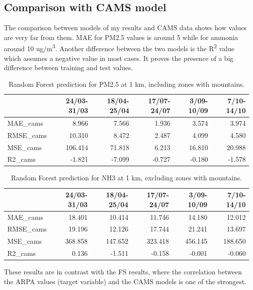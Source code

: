 \subsection{Comparison with CAMS model}
The comparison between models of my results and CAMS data shows how values are very far from them. MAE for PM2.5 values is around 5 while for ammonia around 10 ug/m\textsuperscript{3}. 
Another difference between the two models is the R\textsuperscript{2} value which assumes a negative value in most cases. It proves the presence of a big difference between training and test values. 


\begin{table}[H]
\begin{tabular}{lrrrrr}
\toprule
  &  24/03-31/03 &  18/04-25/04 &  17/07-24/07 &  3/09-10/09 &  7/10-14/10 \\
\midrule
   MAE\_cams &        8.966 &        7.566 &        1.936 &       3.574 &       3.974 \\
  RMSE\_cams &       10.310 &        8.472 &        2.487 &       4.099 &       4.580 \\
   MSE\_cams &      106.414 &       71.818 &        6.213 &      16.810 &      20.988 \\
    R2\_cams &       -1.821 &       -7.099 &       -0.727 &      -0.180 &      -1.578 \\
\bottomrule
\end{tabular}
\caption{Random Forest prediction for PM2.5 at 1 km, including zones with mountains.}
\end{table}
\begin{table}[H]
\begin{tabular}{lrrrrr}
\toprule
  &  24/03-31/03 &  18/04-25/04 &  17/07-24/07 &  3/09-10/09 &  7/10-14/10 \\
\midrule
   MAE\_cams &       18.401 &       10.414 &       11.746 &      14.180 &      12.012 \\
  RMSE\_cams &       19.196 &       12.126 &       17.744 &      21.241 &      13.697 \\
   MSE\_cams &      368.858 &      147.652 &      323.418 &     456.145 &     188.650 \\
    R2\_cams &        0.136 &       -1.511 &       -0.158 &      -0.001 &      -0.060 \\
\bottomrule
\end{tabular}
\caption{Random Forest prediction for NH3 at 1 km, excluding zones with mountains.}
\end{table}
These results are in contrast with the FS results, where the correlation between the ARPA values (target variable) and the CAMS models is one of the strongest.
